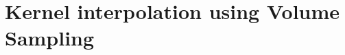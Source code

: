 \documentclass[twoside,11pt]{book}
\numberwithin{theorem}{chapter}
\numberwithin{definition}{chapter}
\numberwithin{proposition}{chapter}
\numberwithin{corollary}{chapter}
\numberwithin{example}{chapter}
\numberwithin{lemma}{chapter}
\numberwithin{assumption}{chapter}
\numberwithin{equation}{chapter}
\numberwithin{figure}{chapter}
\begin{document}



\clearpage

\chapter{Kernel interpolation using Volume Sampling}\label{chap:CVS}
\end{document}
